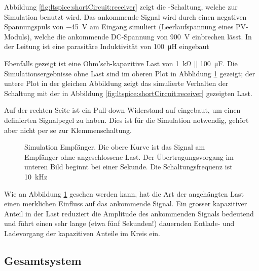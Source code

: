 Abbildung \ref{fig:ltspice:shortCircuit:receiver} zeigt die -Schaltung,
welche zur Simulation benutzt wird.
Das ankommende  Signal  wird  durch   einen  negativen  Spannungspuls  von
\SI{-45}{\volt}   am   Eingang   simuliert   (Leerlaufspannung   eines
PV-Moduls),  welche  die  ankommende DC-Spannung  von  \SI{900}{\volt}
einbrechen   l\"asst. In der Leitung ist eine parasit\"are Induktivit\"at
von \SI{100}{\micro\henry} eingebaut

Ebenfalls gezeigt  ist eine  Ohm'sch-kapazitive Last von  \SI{1}{\kilo\ohm} ||
\SI{100}{\micro\farad}. Die  Simulationsergebnisse ohne  Last  sind im  oberen
Plot in  Abblidung \ref{fig:simu:short:recv} gezeigt;  der untere Plot  in der
gleichen Abbildung  zeigt das  simulierte Verhalten der  Schaltung mit  der in
Abbildung \ref{fig:ltspice:shortCircuit:receiver} gezeigten Last.

Auf  der  rechten  Seite  ist   ein  Pull-down  Widerstand  auf  
eingebaut,  um einen  definierten  Signalpegel zu  haben. Dies  ist f\"ur  die
Simulation notwendig, geh\"ort aber nicht per se zur Klemmenschaltung.

\clearpage
\begin{figure}[h!tb]
    \centering
    
    \caption[Simulationsergebnisse Klemmenschaltung]{%
        Simulation   Empf\"anger. Die   obere   Kurve  ist   das   Signal   am
        Empf\"anger  ohne  angeschlossene Last. Der  \"Ubertragungsvorgang  im
        unteren  Bild beginnt  bei einer  Sekunde. Die Schaltungsfrequenz  ist
        \SI{10}{\kilo\hertz}%
    }
    \label{fig:simu:short:recv}
\end{figure}

Wie  an  Abbildung  \ref{fig:simu:short:recv}  gesehen werden  kann,  hat  die
Art  der  angeh\"angten Last  einen  merklichen  Einfluss auf  das  ankommende
Signal. Ein grosser kapazitiver Anteil in der Last reduziert die Amplitude des
ankommenden  Signals  bedeutend und  f\"uhrt  einen  sehr lange  (etwa  f\"unf
Sekunden!) dauernden Entlade- und Ladevorgang der kapazitiven Anteile im Kreis
ein.


\clearpage
\subsection{Gesamtsystem}
\label{subsec:simu:ask:total}


